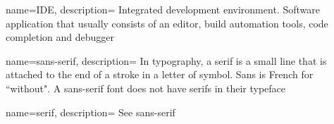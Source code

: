 
 {
    name=IDE,
    description={
        Integrated development environment. Software application that usually consists of an editor, build automation tools, code completion and debugger
    }
}

 {
    name=sans-serif,
    description={
        In typography, a serif is a small line that is attached to the end of a stroke in a letter of symbol. Sans is French for ``without". A sans-serif font does not have serifs in their typeface
    }
}

 {
    name=serif,
    description={
        See sans-serif
    }
}